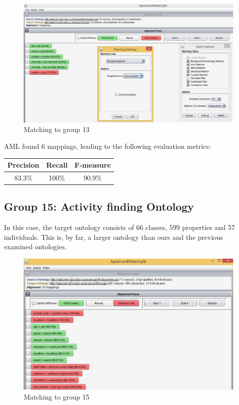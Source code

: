 \documentclass[runningheads,a4paper]{../../StyleFiles/llncs}
\begin{document}
\begin{figure}[h]\centering
	\includegraphics[width=.7\textwidth]{img/match_g13.png}
	\caption{Matching to group 13}
	\label{fig:match_g13}
\end{figure}

AML found 6 mappings, leading to the following evaluation metrics: 

\begin{center}
	\begin{tabular}{| c | c | c |}
		\hline
		\textbf{Precision} & \textbf{Recall} & \textbf{F-measure} \\ \hline
		83.3\% & 100\% & 90.9\% \\ \hline
	\end{tabular}
\end{center}

\subsection{Group 15: Activity finding Ontology}
In this case, the target ontology consists of 66 classes, 599 properties and 57 individuals. This is, by far, a larger ontology than ours and the previous examined ontologies. 

\begin{figure}[h]\centering
	\includegraphics[width=.7\textwidth]{img/match_g15.png}
	\caption{Matching to group 15}
	\label{fig:match_g15}
\end{figure}
\end{document}
